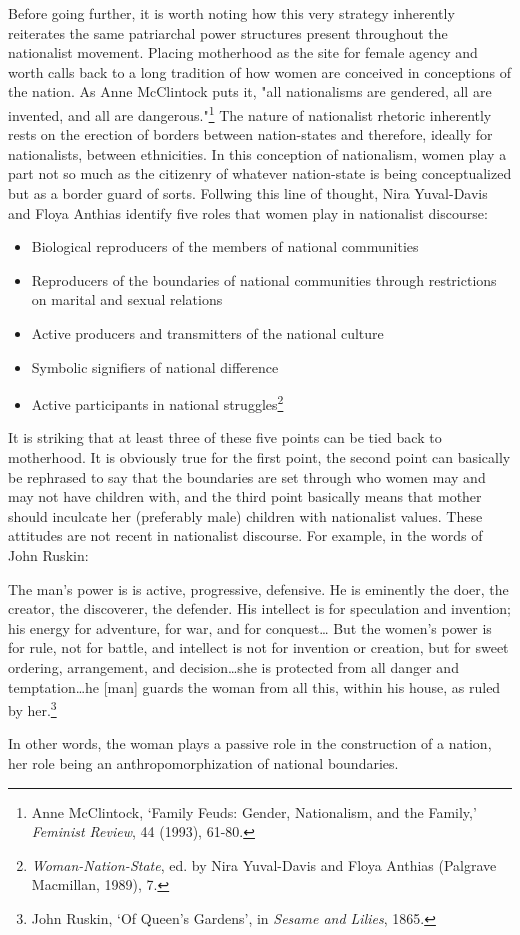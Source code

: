 \documentclass[a4paper, 12pt]{article}
\begin{document}
Before going further, it is worth noting how this very strategy inherently reiterates the same patriarchal power structures present throughout the nationalist movement. Placing motherhood as the site for female agency and worth calls back to a long tradition of how women are conceived in conceptions of the nation. As Anne McClintock puts it, "all nationalisms are gendered, all are invented, and all are dangerous."\footnote{Anne McClintock, ‘Family Feuds: Gender, Nationalism, and the Family,' \textit{Feminist Review}, 44 (1993), 61-80.} The nature of nationalist rhetoric inherently rests on the erection of borders between nation-states and therefore, ideally for nationalists, between ethnicities. In this conception of nationalism, women play a part not so much as the citizenry of whatever nation-state is being conceptualized but as a border guard of sorts. Follwing this line of thought, Nira Yuval-Davis and Floya Anthias identify five roles that women play in nationalist discourse: \begin{displayquote}\begin{itemize}\item Biological reproducers of the members of national communities\item Reproducers of the boundaries of national communities through restrictions on marital and sexual relations\item Active producers and transmitters of the national culture\item Symbolic signifiers of national difference\item Active participants in national struggles\footnote{\textit{Woman-Nation-State}, ed. by Nira Yuval-Davis and Floya Anthias (Palgrave Macmillan, 1989), 7.}\end{itemize}\end{displayquote} It is striking that at least three of these five points can be tied back to motherhood. It is obviously true for the first point, the second point can basically be rephrased to say that the boundaries are set through who women may and may not have children with, and the third point basically means that mother should inculcate her (preferably male) children with nationalist values. These attitudes are not recent in nationalist discourse. For example, in the words of John Ruskin:\begin{displayquote}The man’s power is is active, progressive, defensive. He is eminently the doer, the creator, the discoverer, the defender. His intellect is for speculation and invention; his energy for adventure, for war, and for conquest… But the women’s power is for rule, not for battle, and intellect is not for invention or creation, but for sweet ordering, arrangement, and decision…she is protected from all danger and temptation…he [man] guards the woman from all this, within his house, as ruled by her.\footnote{John Ruskin, ‘Of Queen’s Gardens’, in \textit{Sesame and Lilies}, 1865.}\end{displayquote} In other words, the woman plays a passive role in the construction of a nation, her role being an anthropomorphization of national boundaries. 
\end{document}

